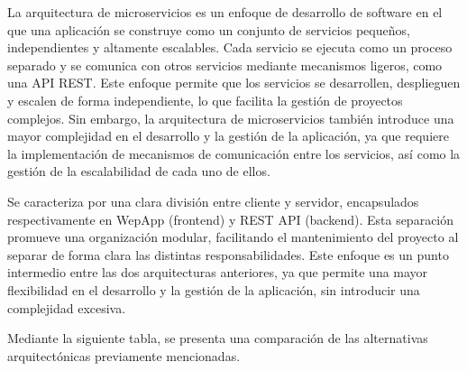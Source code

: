 La arquitectura de microservicios es un enfoque de desarrollo de software en el que una aplicación se construye como un conjunto de servicios pequeños, independientes y altamente escalables. Cada servicio se ejecuta como un proceso separado y se comunica con otros servicios mediante mecanismos ligeros, como una API REST.
Este enfoque permite que los servicios se desarrollen, desplieguen y escalen de forma independiente, lo que facilita la gestión de proyectos complejos. Sin embargo, la arquitectura de microservicios también introduce una mayor complejidad en el desarrollo y la gestión de la aplicación, ya que requiere la implementación de mecanismos de comunicación entre los servicios, así como la gestión de la escalabilidad de cada uno de ellos.

Se caracteriza por una clara división entre cliente y servidor, encapsulados respectivamente en WepApp (frontend) y REST API (backend). Esta separación promueve una organización modular, facilitando el mantenimiento del proyecto al separar de forma clara las distintas responsabilidades. 
Este enfoque es un punto intermedio entre las dos arquitecturas anteriores, ya que permite una mayor flexibilidad en el desarrollo y la gestión de la aplicación, sin introducir una complejidad excesiva. 

Mediante la siguiente tabla, se presenta una comparación de las alternativas arquitectónicas previamente mencionadas.

